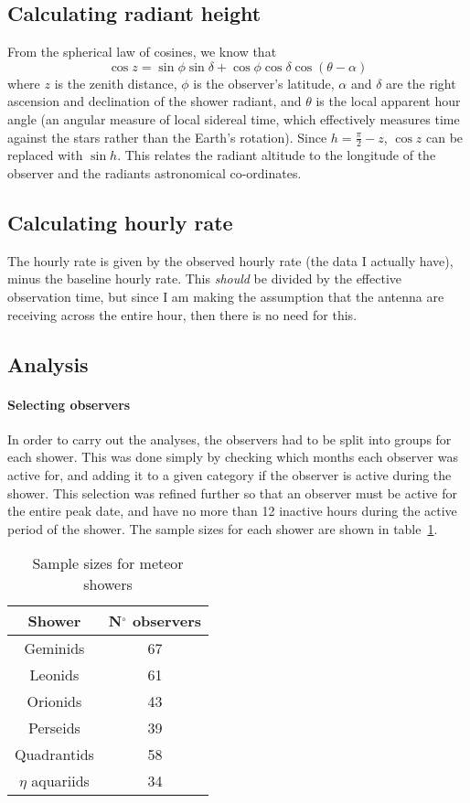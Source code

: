 \subsection{Calculating radiant height}
From the spherical law of cosines, we know that 
\[ \cos z =  \sin \phi \sin \delta + \cos \phi \cos \delta \cos \left(\theta - \alpha\right)\]
where $z$ is the zenith distance, $\phi$ is the observer's latitude, $\alpha$ and $\delta$ are the right ascension and declination of the shower radiant, and $\theta$ is the local apparent hour angle (an angular measure of local sidereal time, which effectively measures time against the stars rather than the Earth's rotation). Since $h = \frac{\pi}{2} - z$, $\cos z$ can be replaced with $\sin h$. This relates the radiant altitude to the longitude of the observer and the radiants astronomical co-ordinates.
\subsection{Calculating hourly rate}
The hourly rate is given by the observed hourly rate (the data I actually have), minus the baseline hourly rate. This \textit{should} be divided by the effective observation time, but since I am making the assumption that the antenna are receiving across the entire hour, then there is no need for this.
\subsection{Analysis}
\paragraph{Selecting observers}
In order to carry out the analyses, the observers had to be split into groups for each shower. This was done simply by checking which months each observer was active for, and adding it to a given category if the observer is active during the shower. This selection was refined further so that an observer must be active for the entire peak date, and have no more than 12 inactive hours during the active period of the shower. The sample sizes for each shower are shown in table~\ref{tab:zhr:sizes}.
\begin{table}
	\centering
	\begin{tabular}{cc}
		\hline
		Shower & N$^{\circ}$ observers \\
		\hline
		Geminids & 67 \\
		Leonids & 61 \\
		Orionids & 43 \\
		Perseids & 39 \\
		Quadrantids & 58 \\
		$\eta$ aquariids & 34 \\
		\hline
	\end{tabular}
	\caption{Sample sizes for meteor showers
		\label{tab:zhr:sizes}}
\end{table}
